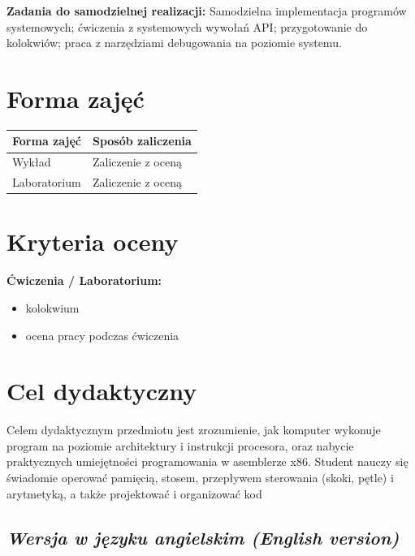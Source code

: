 \documentclass[12pt, a4paper]{article}
\newcommand{\thdrule}{\noalign{\global\setlength{\extrarowheight}{0pt}}}
\newcommand{\thdend}{\noalign{\global\setlength{\extrarowheight}{3pt}}}
\begin{document}
\vspace{4pt}
\noindent\textbf{Zadania do samodzielnej realizacji:} Samodzielna implementacja programów systemowych; ćwiczenia z systemowych wywołań API; przygotowanie do kolokwiów; praca z narzędziami debugowania na poziomie systemu.

\section{Forma zajęć}

\begin{center}
{\scriptsize
\begin{tabular}{m{5cm}m{8cm}}
\thdrule\toprule
\rowcolor{pjatkRed} {\color{white}\textbf{Forma zajęć}} & {\color{white}\textbf{Sposób zaliczenia}} \\
\midrule\thdend
  \rowcolor{tableRowLight} Wykład & Zaliczenie z oceną \\
  \rowcolor{tableRowAlt} Laboratorium & Zaliczenie z oceną \\
\bottomrule
\end{tabular}}
\end{center}

\section{Kryteria oceny}

\textbf{Ćwiczenia / Laboratorium:}
\begin{itemize}
  \item kolokwium
  \item ocena pracy podczas ćwiczenia
\end{itemize}


\section{Cel dydaktyczny}

Celem dydaktycznym przedmiotu jest zrozumienie, jak komputer wykonuje program na poziomie architektury i instrukcji procesora, oraz nabycie praktycznych umiejętności programowania w asemblerze x86. Student nauczy się świadomie operować pamięcią, stosem, przepływem sterowania (skoki, pętle) i arytmetyką, a także projektować i organizować kod

\subsection*{\textit{Wersja w języku angielskim (English version)}}
\end{document}
